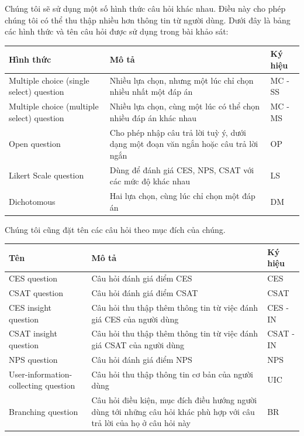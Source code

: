 Chúng tôi sẽ sử dụng một số hình thức câu hỏi khác nhau. Điều này cho phép chúng tôi có thể thu thập nhiều hơn thông tin từ người dùng. Dưới đây là bảng các hình thức và tên câu hỏi được sử dụng trong bài khảo sát:
\begin{center}
    \begin{tabular}{|p{4cm} |p{5cm} |p{1.5cm}|}
 \hline
    Hình thức  & Mô tả & Ký hiệu \\ [0.5ex] 
 \hline
 Multiple choice (single select) question
 & Nhiều lựa chọn, nhưng một lúc chỉ chọn nhiều nhất một đáp án

 & MC - SS \\ 
 \hline
 Multiple choice (multiple select) question & Nhiều lựa chọn, cùng một lúc có thể chọn nhiều đáp án khác nhau & MC - MS \\
 \hline
  Open question & Cho phép nhập câu trả lời tuỳ ý, dưới dạng một đoạn văn ngắn hoặc câu trả lời ngắn & OP \\
 \hline
 Likert Scale question & Dùng để đánh giá CES, NPS, CSAT với các mức độ khác nhau & LS \\
 \hline
 Dichotomous & Hai lựa chọn, cùng lúc chỉ chọn một đáp án & DM \\ [1ex] 
 \hline
\end{tabular}
\end{center}
\par
Chúng tôi cũng đặt tên các câu hỏi theo mục đích của chúng.
\begin{center}
    
   \begin{tabular}{|p{3cm} |p{5cm} |p{1.5cm}|}
 \hline
   Tên  & Mô tả & Ký hiệu \\ [0.5ex] 
 \hline
 CES question
 & Câu hỏi đánh giá điểm CES

 & CES \\ 
 \hline
 CSAT question & Câu hỏi đánh giá điểm CSAT & CSAT \\
 \hline
CES insight question & Câu hỏi thu thập thêm thông tin từ việc đánh giá CES của người dùng & CES - IN \\
 \hline
 CSAT insight question & Câu hỏi thu thập thêm thông tin từ việc đánh giá CSAT của người dùng & CSAT - IN \\
 \hline
 NPS question & Câu hỏi đánh giá điểm NPS & NPS \\ 
 \hline
 User-information-collecting question & Câu hỏi thu thập thông tin cơ bản của người dùng & UIC \\ 
 \hline
 Branching question & Câu hỏi điều kiện, mục đích điều hướng người dùng tới những câu hỏi khác phù hợp với câu trả lời của họ ở câu hỏi này & BR \\ [1ex]
 \hline 
\end{tabular}
\end{center}

